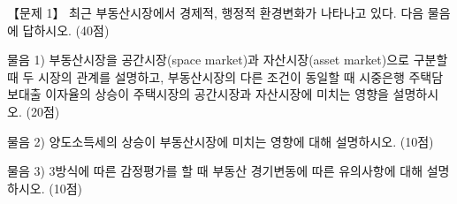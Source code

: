 \begin{longquestion}{【문제 1】}
최근 부동산시장에서 경제적, 행정적 환경변화가 나타나고 있다. 다음 물음에 답하시오. (40점) \par
\medskip\noindent 물음 1) 부동산시장을 공간시장(space market)과 자산시장(asset market)으로 구분할 때 두 시장의 관계를 설명하고, 부동산시장의 다른 조건이 동일할 때 시중은행 주택담보대출 이자율의 상승이 주택시장의 공간시장과 자산시장에 미치는 영향을 설명하시오. (20점) \par
\medskip\noindent 물음 2) 양도소득세의 상승이 부동산시장에 미치는 영향에 대해 설명하시오. (10점) \par
\medskip\noindent 물음 3) 3방식에 따른 감정평가를 할 때 부동산 경기변동에 따른 유의사항에 대해 설명하시오. (10점) \par
\end{longquestion}
